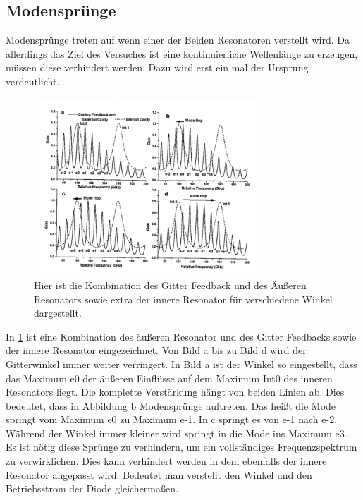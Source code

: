 \subsection{Modensprünge}
Modensprünge treten auf wenn einer der Beiden Resonatoren verstellt wird.
Da allerdings das Ziel des Versuches ist eine kontinuierliche Wellenlänge zu erzeugen, müssen diese verhindert werden.
Dazu wird erst ein mal der Ursprung verdeutlicht. 
\begin{figure}[h!]
	\centering
	\includegraphics[width = 0.75\textwidth, angle = 1]{../Grafiken/Moden_Spruenge.pdf}
	\caption{Hier ist die Kombination des Gitter Feedback und des Äußeren Resonators sowie extra der innere Resonator für verschiedene Winkel dargestellt.\cite{V60}\label{fig:Moden_Spruenge}}
\end{figure}
In \cref{fig:Moden_Spruenge} ist eine Kombination des äußeren Resonator und des Gitter Feedbacks sowie der innere Resonator eingezeichnet.
Von Bild a bis zu Bild d wird der Gitterwinkel immer weiter verringert.
In Bild a ist der Winkel so eingestellt, dass das Maximum e0 der äußeren Einflüsse auf dem Maximum Int0 des inneren Resonators liegt.
Die komplette Verstärkung hängt von beiden Linien ab.
Dies bedeutet, dass in Abbildung b Modensprünge auftreten.
Das heißt die Mode springt vom Maximum e0 zu Maximum e-1.
In c springt es von e-1 nach e-2.
Während der Winkel immer kleiner wird springt in die Mode ins Maximum e3.\\
Es ist nötig diese Sprünge zu verhindern, um ein vollständiges Frequenzspektrum zu verwirklichen.
Dies kann verhindert werden in dem ebenfalls der innere Resonator angepasst wird.
Bedeutet man verstellt den Winkel und den Betriebsstrom der Diode gleichermaßen.